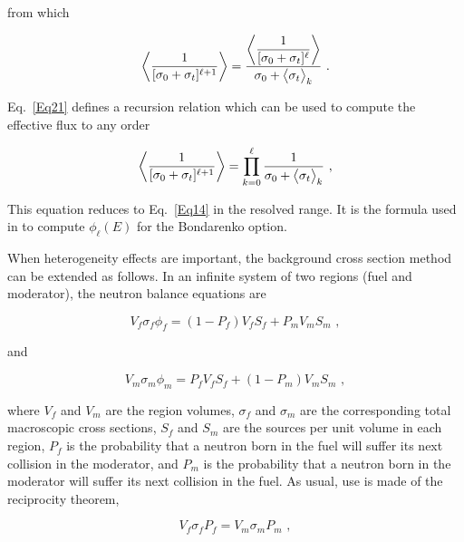 \noindent
from which

  \begin{equation}
    \biggl<{{1}\over{[\sigma_0+\sigma_t]^{\ell+1}}}\biggr>
    = {\displaystyle{\biggl<{{1}\over{[\sigma_0+\sigma_t]^{\ell}}}\biggr>}
    \over{\sigma_0+\bigl<\sigma_t\bigr>_k}}\,\,.
  \label{Eq21}
  \end{equation}

\noindent
Eq.~\ref{Eq21} defines a recursion relation which can be used to compute
the effective flux to any order

  \begin{equation}
    \biggl<{{1}\over{[\sigma_0+\sigma_t]^{\ell+1}}}\biggr>
    = \prod_{k=0}^{\ell}{1\over{\sigma_0+\bigl<\sigma_t\bigr>_k}}\,\,,
  \label{Eq22}
  \end{equation}
\vspace{0.5 pt}

\noindent
This equation reduces to Eq.~\ref{Eq14} in the resolved range.  It is
the formula used in  to compute $\phi_{\ell}(E)$ for the
Bondarenko option.

When heterogeneity effects are important, the
background cross section method can be extended as follows.  In an
infinite system of two regions (fuel and moderator), the neutron
balance equations are

  \begin{equation}
    V_f\sigma_f\phi_f=(1-P_f)V_f S_f+P_m V_m S_m\,\,,
  \end{equation}

\noindent
and

  \begin{equation}
    V_m\sigma_m\phi_m=P_f V_f S_f+(1-P_m)V_m S_m\,\,,
  \end{equation}

\noindent
where $V_f$ and $V_m$ are the region volumes, $\sigma_f$ and $\sigma_m$
are the corresponding total macroscopic cross sections, $S_f$ and $S_m$
are the sources per unit volume in each region, $P_f$ is the probability
that a neutron born in the fuel will suffer its next collision in the
moderator, and $P_m$ is the probability that a neutron born in the
moderator will suffer its next collision in the fuel.  As usual, use
is made of the reciprocity theorem,

  \begin{equation}
    V_f\sigma_f P_f=V_m\sigma_m P_m \,\,,
  \end{equation}

